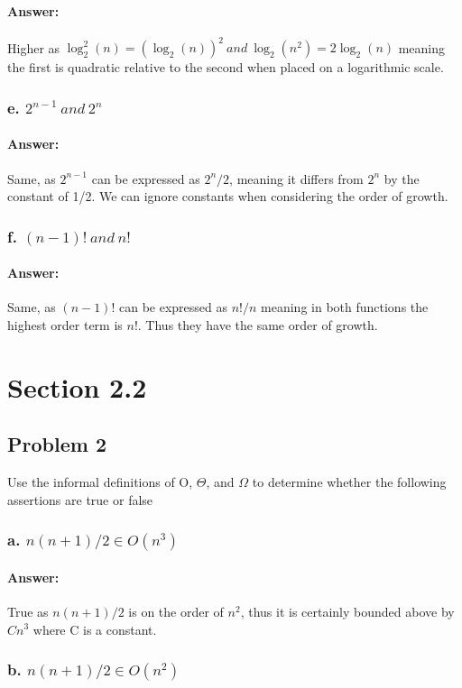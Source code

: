 \documentclass{article}
\begin{document}
      \paragraph{Answer:}
        Higher as $\log_{2}^2(n) = (\log_{2}(n))^2 \ and \ \log_{2}(n^2) = 2\log_{2}(n)$ meaning the first is quadratic relative to the second when placed on a logarithmic scale.
    \subsubsection{e. $2^{n-1} \ and \ 2^n$}
      \paragraph{Answer:}
        Same, as $2^{n-1}$ can be expressed as $2^n/2$, meaning it differs from $2^n$ by the constant of 1/2. We can ignore constants when considering the order of growth.
    \subsubsection{f. $(n-1)! \ and \ n!$}
      \paragraph{Answer:}
        Same, as $(n-1)!$ can be expressed as $n!/n$ meaning in both functions the highest order term is $n!$. Thus they have the same order of growth.
\section{Section 2.2}
  \subsection{Problem 2}
  Use the informal definitions of O, $\Theta$, and $\Omega$ to determine whether the following assertions are true or false
  \subsubsection{a. $n(n + 1)/2 \in O(n^3 )$}
    \paragraph{Answer: \newline}
      True as $n(n+1)/2$ is on the order of $n^2$, thus it is certainly bounded above by $Cn^3$ where C is a constant.
  \subsubsection{b. $n(n + 1)/2 \in O(n^2 )$}
\end{document}
